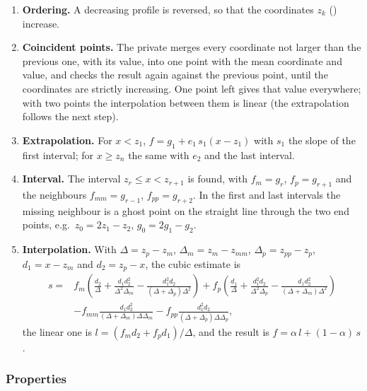 \begin{enumerate}
  \item \textbf{Ordering.} A decreasing profile is reversed, so that the
        coordinates $z_k$ () increase.
  \item \textbf{Coincident points.} The private 
        merges every coordinate not larger than the previous one, with its
        value, into one point with the mean coordinate and value, and checks
        the result again against the previous point, until the coordinates
        are strictly increasing. One point left gives that value everywhere;
        with two points the interpolation between them is linear (the
        extrapolation follows the next step).
  \item \textbf{Extrapolation.} For $x < z_1$,
        $f = g_1 + e_1\,s_1(x - z_1)$ with $s_1$ the slope of the first
        interval; for $x \ge z_n$ the same with $e_2$ and the last interval.
  \item \textbf{Interval.} The interval $z_r \le x < z_{r+1}$ is found,
        with $f_m = g_r$, $f_p = g_{r+1}$ and the neighbours
        $f_{mm} = g_{r-1}$, $f_{pp} = g_{r+2}$. In the first and last
        intervals the missing neighbour is a ghost point on the straight
        line through the two end points, e.g.\ $z_0 = 2z_1 - z_2$,
        $g_0 = 2g_1 - g_2$.
  \item \textbf{Interpolation.} With $\Delta = z_p - z_m$,
        $\Delta_m = z_m - z_{mm}$, $\Delta_p = z_{pp} - z_p$,
        $d_1 = x - z_m$ and $d_2 = z_p - x$, the cubic estimate is
        \[
          \begin{aligned}
            s ={}& f_m\left(\frac{d_2}{\Delta} + \frac{d_1 d_2^2}{\Delta^2\Delta_m}
                   - \frac{d_1^2 d_2}{(\Delta+\Delta_p)\Delta^2}\right)
                 + f_p\left(\frac{d_1}{\Delta} + \frac{d_1^2 d_2}{\Delta^2\Delta_p}
                   - \frac{d_1 d_2^2}{(\Delta+\Delta_m)\Delta^2}\right) \\
                 & - f_{mm}\frac{d_1 d_2^2}{(\Delta+\Delta_m)\Delta\Delta_m}
                   - f_{pp}\frac{d_1^2 d_2}{(\Delta+\Delta_p)\Delta\Delta_p},
          \end{aligned}
        \]
        the linear one is $l = (f_m d_2 + f_p d_1)/\Delta$, and the result
        is $f = \alpha\,l + (1 - \alpha)\,s$.
\end{enumerate}

\subsubsection{Properties}

